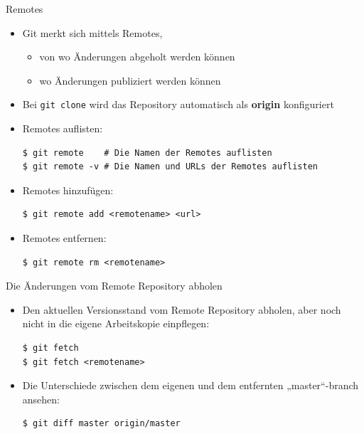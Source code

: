 \begin{frame}{Remotes}
  \begin{itemize}
    \item Git merkt sich mittels Remotes,
    \begin{itemize}
      \item von wo Änderungen abgeholt werden können
      \item wo Änderungen publiziert werden können
    \end{itemize}
    \item Bei \texttt{git clone} wird das Repository automatisch
        als \textbf{origin} konfiguriert
    \item Remotes auflisten:
    \begin{lstlisting}
$ git remote    # Die Namen der Remotes auflisten
$ git remote -v # Die Namen und URLs der Remotes auflisten
    \end{lstlisting}
  \end{itemize}
  \framebreak

  \begin{itemize}
    \item Remotes hinzufügen:
    \begin{lstlisting}
$ git remote add <remotename> <url>
    \end{lstlisting}
    \item Remotes entfernen:
    \begin{lstlisting}
$ git remote rm <remotename>
    \end{lstlisting}
  \end{itemize}

\end{frame}

\begin{frame}[fragile]{Die Änderungen vom Remote Repository abholen}
  \begin{itemize}
    \item Den aktuellen Versionsstand vom Remote Repository abholen, aber noch nicht in die eigene Arbeitskopie einpflegen:
    \begin{lstlisting}
$ git fetch
$ git fetch <remotename>
    \end{lstlisting}
    \item Die Unterschiede zwischen dem eigenen und dem entfernten „master“-branch ansehen:
    \begin{lstlisting}
$ git diff master origin/master
    \end{lstlisting}
  \end{itemize}
\end{frame}

